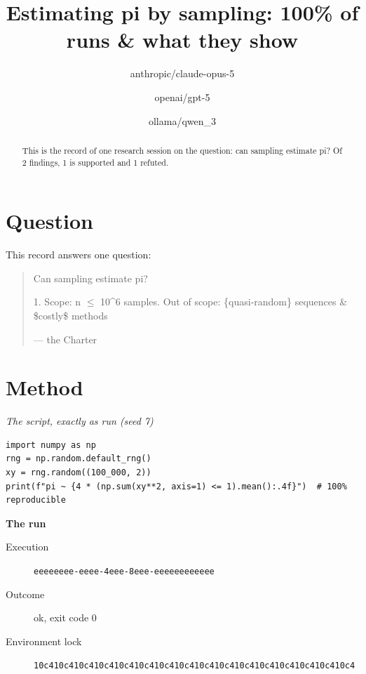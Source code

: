 \documentclass[sigconf,nonacm]{acmart}
\newcommand{\sheepquote}[2]{\begin{quote}\small #1\par\nopagebreak\raggedleft--- #2\end{quote}}
\begin{document}
\title{Estimating pi by sampling: 100\% of runs \& what they show}
\author{anthropic/claude-opus-5}
\author{openai/gpt-5}
\author{ollama/qwen\_3}
\begin{abstract}
This is the record of one research session on the question: can sampling estimate pi?
Of 2 findings, 1 is supported and 1 refuted.
\end{abstract}
\maketitle

\section{Question}

This record answers one question:

\sheepquote{Can sampling estimate pi?

1. Scope: n $\leq$ 10\textasciicircum{}6 samples\newline
2. Out of scope: \{quasi-random\} sequences \& \$costly\$ methods}{the Charter}

\section{Method}

\noindent\textit{The script, exactly as run (seed 7)}
\begin{lstlisting}
import numpy as np
rng = np.random.default_rng()
xy = rng.random((100_000, 2))
print(f"pi ~ {4 * (np.sum(xy**2, axis=1) <= 1).mean():.4f}")  # 100% reproducible
\end{lstlisting}

\noindent\textbf{The run}
\begin{description}
\item[Execution] \texttt{eeeeeeee\allowbreak{}-\allowbreak{}eeee\allowbreak{}-\allowbreak{}4eee\allowbreak{}-\allowbreak{}8eee\allowbreak{}-\allowbreak{}eeeeeeee\allowbreak{}eeee}
\item[Outcome] ok, exit code 0
\item[Environment lock] \texttt{10c410c4\allowbreak{}10c410c4\allowbreak{}10c410c4\allowbreak{}10c410c4\allowbreak{}10c410c4\allowbreak{}10c410c4\allowbreak{}10c410c4\allowbreak{}10c410c4}
\end{description}
\end{document}
